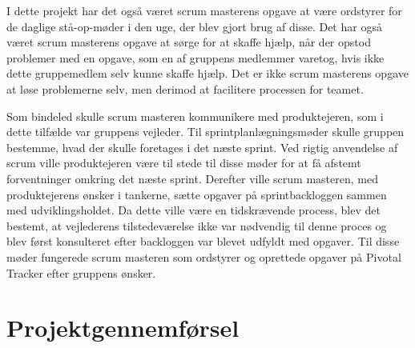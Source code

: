 
I dette projekt har det også været scrum masterens opgave at være ordstyrer for de daglige stå-op-møder i den uge, der blev gjort brug af disse. Det har også været scrum masterens opgave at sørge for at skaffe hjælp, når der opstod problemer med en opgave, som en af gruppens medlemmer varetog, hvis ikke dette gruppemedlem selv kunne skaffe hjælp. Det er ikke scrum masterens opgave at løse problemerne selv, men derimod at facilitere processen for teamet. 


Som bindeled skulle scrum masteren kommunikere med produktejeren, som i dette tilfælde var gruppens vejleder. Til sprintplanlægningsmøder skulle gruppen bestemme, hvad der skulle foretages i det næste sprint. Ved rigtig anvendelse af scrum ville produktejeren være til stede til disse møder for at få afstemt forventninger omkring det næste sprint. Derefter ville scrum masteren, med produktejerens ønsker i tankerne, sætte opgaver på sprintbackloggen sammen med udviklingsholdet. Da dette ville være en tidskrævende process, blev det bestemt, at vejlederens tilstedeværelse ikke var nødvendig til denne proces og blev først konsulteret efter backloggen var blevet udfyldt med opgaver. Til disse møder fungerede scrum masteren som ordstyrer og oprettede opgaver på Pivotal Tracker efter gruppens ønsker. \par 


\chapter{Projektgennemførsel}


